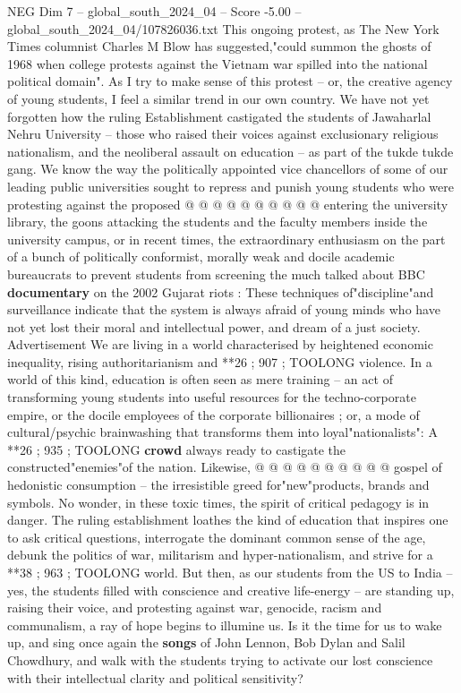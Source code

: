 \begin{textsample}{NEG Dim 7 – global\_south\_2024\_04 – Score -5.00 – global\_south\_2024\_04/107826036.txt}
This ongoing protest, as The New York Times columnist Charles M Blow has suggested,"could summon the ghosts of 1968 when college protests against the Vietnam war spilled into the national political domain".
As I try to make sense of this protest -- or, the creative agency of young students, I feel a similar trend in our own country.
We have not yet forgotten how the ruling Establishment castigated the students of Jawaharlal Nehru University -- those who raised their voices against exclusionary religious nationalism, and the neoliberal assault on education -- as part of the tukde tukde gang.
We know the way the politically appointed vice chancellors of some of our leading public universities sought to repress and punish young students who were protesting against the proposed @ @ @ @ @ @ @ @ @ @ entering the university library, the goons attacking the students and the faculty members inside the university campus, or in recent times, the extraordinary enthusiasm on the part of a bunch of politically conformist, morally weak and docile academic bureaucrats to prevent students from screening the much talked about BBC \textbf{documentary} on the 2002 Gujarat riots : These techniques of"discipline"and surveillance indicate that the system is always afraid of young minds who have not yet lost their moral and intellectual power, and dream of a just society.
Advertisement We are living in a world characterised by heightened economic inequality, rising authoritarianism and **26 ; 907 ; TOOLONG violence.
In a world of this kind, education is often seen as mere training -- an act of transforming young students into useful resources for the techno-corporate empire, or the docile employees of the corporate billionaires ; or, a mode of cultural/psychic brainwashing that transforms them into loyal"nationalists": A **26 ; 935 ; TOOLONG \textbf{crowd} always ready to castigate the constructed"enemies"of the nation.
Likewise, @ @ @ @ @ @ @ @ @ @ gospel of hedonistic consumption -- the irresistible greed for"new"products, brands and symbols.
No wonder, in these toxic times, the spirit of critical pedagogy is in danger.
The ruling establishment loathes the kind of education that inspires one to ask critical questions, interrogate the dominant common sense of the age, debunk the politics of war, militarism and hyper-nationalism, and strive for a **38 ; 963 ; TOOLONG world.
But then, as our students from the US to India -- yes, the students filled with conscience and creative life-energy -- are standing up, raising their voice, and protesting against war, genocide, racism and communalism, a ray of hope begins to illumine us.
Is it the time for us to wake up, and sing once again the \textbf{songs} of John Lennon, Bob Dylan and Salil Chowdhury, and walk with the students trying to activate our lost conscience with their intellectual clarity and political sensitivity?

\end{textsample}
